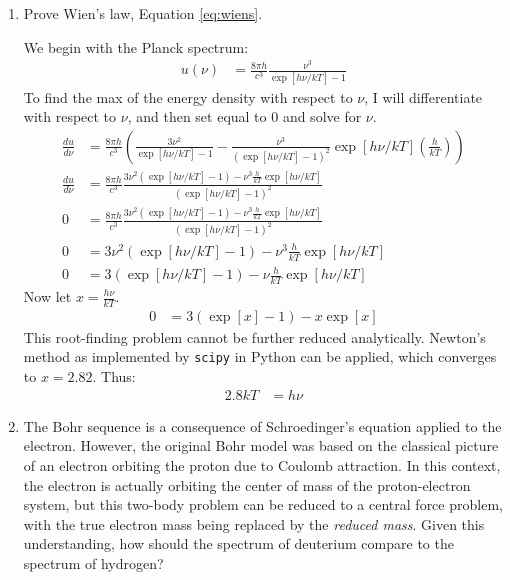 \begin{enumerate}
\item Prove Wien's law, Equation \ref{eq:wiens}.

\begin{answer}
We begin with the Planck spectrum:
    \begin{align*}
        u(\nu) & = \frac{8 \pi h}{c^3} \frac{\nu^3}{\exp[h \nu / k T] - 1}
    \end{align*}
    To find the max of the energy density with respect to $\nu$, I will differentiate with respect to $\nu$, and then set equal to 0 and solve for $\nu$.
    \begin{align*}
        \frac{d u}{d \nu} & = \frac{8 \pi h}{c^3}
    \left( \frac{3 \nu^2}{\exp[h \nu / k T] - 1} - \frac{\nu^3}{(\exp[h \nu
    / k T] - 1)^2}\exp[h \nu/k T]\left(\frac{h}{k T}\right) \right) \\
        \frac{d u}{d \nu} & = \frac{8 \pi h}{c^3} \frac{3 \nu^2 (\exp[h \nu / k T] - 1) - \nu^3 \frac{h}{k T} \exp[h \nu/k T]}{(\exp[h \nu / k T] - 1)^2} \\
        0 & = \frac{8 \pi h}{c^3} \frac{3 \nu^2 (\exp[h \nu / k T] - 1) - \nu^3 \frac{h}{k T} \exp[h \nu/k T]}{(\exp[h \nu / k T] - 1)^2} \\
        0 & =  3 \nu^2 (\exp[h \nu / k T] - 1) - \nu^3 \frac{h}{k T} \exp[h \nu/k T] \\
        0 & =  3 (\exp[h \nu / k T] - 1) - \nu \frac{h}{k T} \exp[h \nu/k T]
    \end{align*}
    Now let $x = \frac{h \nu}{k T}$.
    \begin{align*}
        0 & =  3 (\exp[x] - 1) - x \exp[x]
    \end{align*}
    This root-finding problem cannot be further reduced
    analytically. Newton's method as
    implemented by {\tt scipy} in Python can be applied, which
    converges to $x=2.82$. Thus:
    \begin{align*}
        2.8 k T & = h \nu
    \end{align*}
\end{answer}

\item The Bohr sequence is a consequence of Schroedinger's equation
  applied to the electron. However, the original Bohr model was based
  on the classical picture of an electron orbiting the proton due to
  Coulomb attraction. In this context, the electron is actually
  orbiting the center of mass of the proton-electron system, but this
  two-body problem can be reduced to a central force problem, with the
  true electron mass being replaced by the {\it reduced mass}. Given
  this understanding, how should the spectrum of deuterium compare to
  the spectrum of hydrogen?
\end{enumerate}

